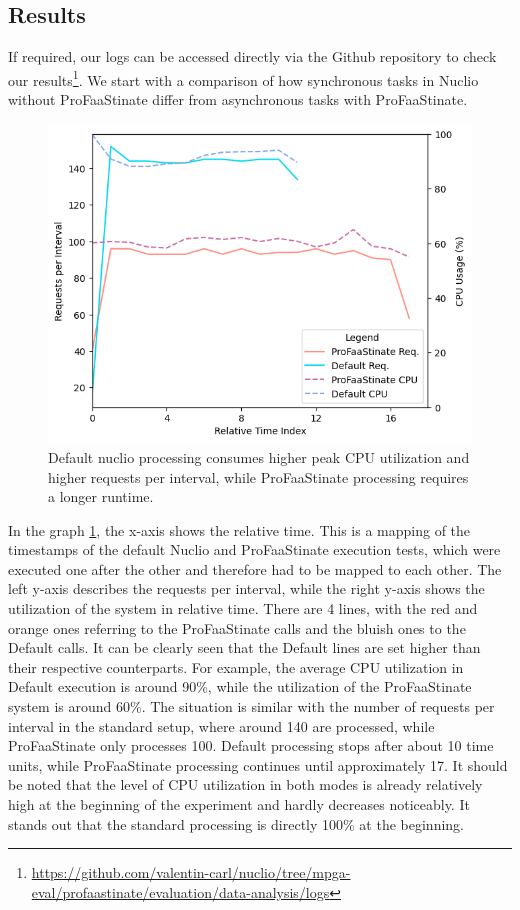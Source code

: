 \subsection{Results}
If required, our logs can be accessed directly via the Github repository to check our results\footnote{\url{https://github.com/valentin-carl/nuclio/tree/mpga-eval/profaastinate/evaluation/data-analysis/logs}}. 
We start with a comparison of how synchronous tasks in Nuclio without ProFaaStinate differ from asynchronous tasks with ProFaaStinate. 

\begin{figure}
    \centering
    \includegraphics[width=\linewidth]{figures/profaastinate/results/line_chart.png}
    \caption{Default nuclio processing consumes higher peak CPU utilization and higher requests per interval, while ProFaaStinate processing requires a longer runtime.}
    \label{fig:metrics-comparision}
\end{figure}

In the graph \ref{fig:metrics-comparision}, the x-axis shows the relative time. This is a mapping of the timestamps of the default Nuclio and ProFaaStinate execution tests, which were executed one after the other and therefore had to be mapped to each other. The left y-axis describes the requests per interval, while the right y-axis shows the utilization of the system in relative time. There are 4 lines, with the red and orange ones referring to the ProFaaStinate calls and the bluish ones to the Default calls. 
It can be clearly seen that the Default lines are set higher than their respective counterparts. For example, the average CPU utilization in Default execution is around 90\%, while the utilization of the ProFaaStinate system is around 60\%. 
The situation is similar with the number of requests per interval in the standard setup, where around 140 are processed, while ProFaaStinate only processes 100. Default processing stops after about 10 time units, while ProFaaStinate processing continues until approximately 17. It should be noted that the level of CPU utilization in both modes is already relatively high at the beginning of the experiment and hardly decreases noticeably. It stands out that the standard processing is directly 100\% at the beginning.


